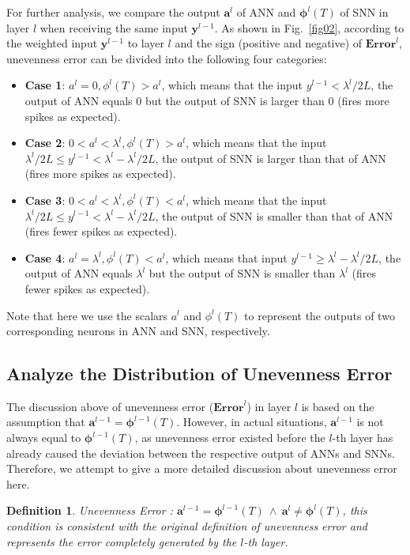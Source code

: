 \documentclass[letterpaper]{article} %
\newtheorem{definition}{Definition}
\begin{document}
For further analysis, we compare the output $\boldsymbol{a}^{l}$ of ANN and $\boldsymbol{\phi}^{l}(T)$ of SNN in layer $l$ when receiving the same input $\boldsymbol{y}^{l-1}$.
As shown in  Fig.~\ref{fig02},
according to the  weighted input $\boldsymbol{y}^{l-1}$ to layer $l$ and the sign (positive and negative) of $\textbf{Error}^l$, unevenness error can be divided into the following four categories:
\begin{itemize}
    \item[$\bullet$] \textbf{Case 1}: ${a}^l=0, \phi^l(T)>{a}^l$, which means that the input ${y}^{l-1}< \lambda^l/2L$, the output of ANN equals 0 but the output of SNN is larger than 0 (fires more spikes as expected).
     \item[$\bullet$] \textbf{Case 2}: $0<{a}^l<\lambda^l,\phi^l(T)>{a}^l$, which means that the input $\lambda^l/2L \leqslant {y}^{l-1}<\lambda^l-\lambda^l/2L$, the output of SNN is larger than that of ANN (fires more spikes as expected).
     \item[$\bullet$] \textbf{Case 3}: $0<{a}^l<\lambda^l,\phi^l(T)<{a}^l$, which means that the input $\lambda^l/2L \leqslant {y}^{l-1}<\lambda^l-\lambda^l/2L$, the output of SNN is smaller than that of ANN (fires fewer spikes as expected).
        \item[$\bullet$] \textbf{Case 4}: ${a}^l=\lambda^l,\phi^l(T)<{a}^l$, which means that  input ${y}^{l-1}\geqslant \lambda^l-\lambda^l/2L$, the output of ANN equals $\lambda^l$ but the output of SNN is smaller than $\lambda^l$ (fires fewer spikes as expected).
\end{itemize}
Note that here we use the scalars $a^l$ and $\phi^l(T)$ to represent the outputs of two corresponding neurons in ANN and SNN, respectively.

\subsection{Analyze the Distribution of Unevenness Error}
The discussion above of unevenness error ($\textbf{Error}^l$) in layer $l$ is based on the assumption that $\boldsymbol{a}^{l-1}=\boldsymbol{\phi}^{l-1}(T)$. However, in actual situations, $\boldsymbol{a}^{l-1}$ is not always equal to $\boldsymbol{\phi}^{l-1}(T)$, as unevenness error existed before the $l$-th layer has already caused the deviation between the respective output of ANNs and SNNs. Therefore, we attempt to give a more detailed discussion about unevenness error here.

\begin{definition}
\rm{Unevenness Error \uppercase\expandafter{}}: $\boldsymbol{a}^{l-1}=\boldsymbol{\phi}^{l-1}(T)~\wedge~\boldsymbol{a}^{l} \neq \boldsymbol{\phi}^{l}(T)$, this condition is consistent with the original definition of unevenness error and represents the error completely generated by the $l$-th layer.
\end{definition}
\end{document}
